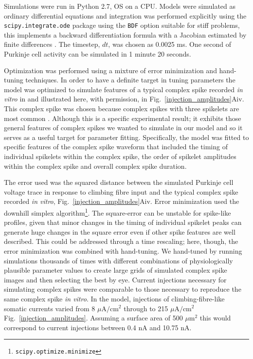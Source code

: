 \documentclass[twocolumn]{svjour3}          %
\begin{document}
Simulations were run in Python 2.7, OS on a CPU. Models were simulated
as ordinary differential equations and integration was performed
explicitly using the \texttt{scipy.integrate.ode} package using the
\texttt{BDF} option suitable for stiff problems, this implements a
backward differentiation formula with a Jacobian estimated by finite
differences \citep{ByrneHindmarsh1975}. The timestep, $dt$, was chosen
as 0.0025 ms. One second of Purkinje cell activity can be simulated in
1 minute 20 seconds.

Optimization was performed using a mixture of error minimization and
hand-tuning techniques. In order to have a definite
target in tuning parameters the model was optimized to simulate
features of a typical complex spike recorded \textit{in vitro} in
\citet{DavieEtAl2008} and illustrated here, with permission, in
Fig.~\ref{injection_amplitudes}Aiv. This complex spike was chosen
because complex spikes with three spikelets are most common
\citep{BurroughsEtAl2016}. Although this is a specific experimental
result; it exhibits those general features of complex spikes we wanted
to simulate in our model and so it serves as a useful target for
parameter fitting. Specifically, the model was fitted to specific
features of the complex spike waveform that included the timing of
individual spikelets within the complex spike, the order of spikelet
amplitudes within the complex spike and overall complex spike
duration.

The error used was the squared distance between the simulated Purkinje
cell voltage trace in response to climbing fibre input and the typical
complex spike recorded \textit{in vitro},
Fig.~\ref{injection_amplitudes}Aiv. Error minimization used the
downhill simplex
algorithm\footnote{\texttt{scipy.optimize.minimize}}. The square-error
can be unstable for spike-like profiles, given that minor changes in
the timing of individual spikelet peaks can generate huge changes in
the square error even if other spike features are well described. This
could be addressed through a time rescaling; here, though, the error
minimization was combined with hand-tuning. We hand-tuned by running
simulations thousands of times with different combinations of
physiologically plausible parameter values to create large grids of
simulated complex spike images and then selecting the best by
eye. Current injections necessary for simulating complex spikes were
comparable to those necessary to reproduce the same complex spike
\textit{in vitro}. In the model, injections of climbing-fibre-like
somatic currents varied from 8 $\mu$A$/$cm$^2$ through to 215
$\mu$A$/$cm$^2$ Fig.~\ref{injection_amplitudes}. Assuming a surface
area of 500 $\mu$m$^2$ this would correspond to current injections
between 0.4 nA and 10.75 nA.
\end{document}
